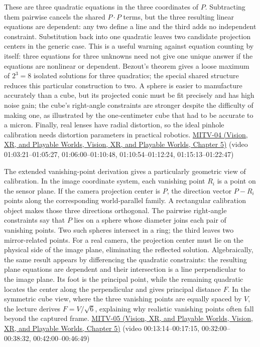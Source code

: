 These are three quadratic equations in the three coordinates of \(P\). Subtracting them pairwise cancels the shared \(P\cdot P\) terms, but the three resulting linear equations are dependent: any two define a line and the third adds no independent constraint. Substitution back into one quadratic leaves two candidate projection centers in the generic case. This is a useful warning against equation counting by itself: three equations for three unknowns need not give one unique answer if the equations are nonlinear or dependent. Bezout's theorem gives a loose maximum of \(2^3=8\) isolated solutions for three quadratics; the special shared structure reduces this particular construction to two. A sphere is easier to manufacture accurately than a cube, but its projected conic must be fit precisely and has high noise gain; the cube's right-angle constraints are stronger despite the difficulty of making one, as illustrated by the one-centimeter cube that had to be accurate to a micron. Finally, real lenses have radial distortion, so the ideal pinhole calibration needs distortion parameters in practical robotics. \href{../07-Vision-XR-and-Playable-Worlds/main.pdf\#nameddest=04-visual-computing-ii-ch036-mitv-04---fixed-optical-flow-optical-mouse-constant-brightness-assumption-closed-form-solution}{MITV-04 (Vision, XR, and Playable Worlds, Vision, XR, and Playable Worlds, Chapter 5)} (video 01:03:21--01:05:27, 01:06:00--01:10:48, 01:10:54--01:12:24, 01:15:13--01:22:47)

The extended vanishing-point derivation gives a particularly geometric view of calibration. In the image coordinate system, each vanishing point \(R_i\) is a point on the sensor plane. If the camera projection center is \(P\), the direction vector \(P-R_i\) points along the corresponding world-parallel family. A rectangular calibration object makes those three directions orthogonal. The pairwise right-angle constraints say that \(P\) lies on a sphere whose diameter joins each pair of vanishing points. Two such spheres intersect in a ring; the third leaves two mirror-related points. For a real camera, the projection center must lie on the physical side of the image plane, eliminating the reflected solution. Algebraically, the same result appears by differencing the quadratic constraints: the resulting plane equations are dependent and their intersection is a line perpendicular to the image plane. Its foot is the principal point, while the remaining quadratic locates the center along the perpendicular and gives principal distance \(F\). In the symmetric cube view, where the three vanishing points are equally spaced by \(V\), the lecture derives \(F=V/\sqrt{6}\), explaining why realistic vanishing points often fall beyond the captured frame. \href{../07-Vision-XR-and-Playable-Worlds/main.pdf\#nameddest=04-visual-computing-ii-ch036-mitv-05---tcc-and-for-montivision-demos-vanishing-point-use-of-vps-in-camera-calibration}{MITV-05 (Vision, XR, and Playable Worlds, Vision, XR, and Playable Worlds, Chapter 5)} (video 00:13:14--00:17:15, 00:32:00--00:38:32, 00:42:00--00:46:49)

